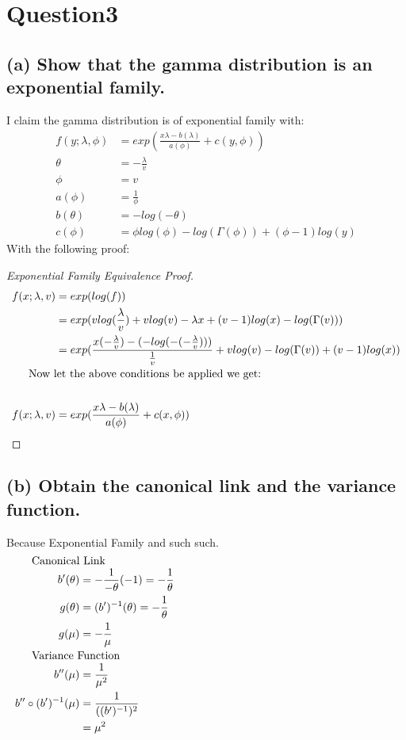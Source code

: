 \documentclass[15pt,a4paper]{article}\usepackage[]{graphicx}\usepackage[]{color}
\begin{document}
\section{Question3}
\subsection{(a) Show that the gamma distribution is an exponential family.}
I claim the gamma distribution is of exponential family with:
\begin{align*}
f(y; \lambda, \phi) &= exp(\frac{x\lambda - b(\lambda)}{a(\phi)} + c(y, \phi))\\
\theta &= -\frac{\lambda}{v}\\
\phi &= v\\
a(\phi) &= \frac{1}{\phi}\\
b(\theta) &= -log(-\theta)\\
c(\phi) &= \phi log(\phi) - log(\Gamma(\phi)) + (\phi-1)log(y)
\end{align*}
With the following proof:
\begin{proof}[Exponential Family Equivalence Proof]
    \begin{align*}
    f(x;\lambda, v) &= exp(log(f)) \\
      &= exp(vlog(\frac{\lambda}{v}) + vlog(v) -\lambda x + (v-1)log(x) - log(\Gamma(v)))\\
      &= exp(\frac{x(-\frac{\lambda}{v}) - (-log(-(-\frac{\lambda}{v})))}{\frac{1}{v}} + v log(v) - log(\Gamma(v)) + (v-1)log(x))\\
      \noalign{\text{Now let the above conditions be applied we get:}}\\
      f(x;\lambda, v) &= exp(\frac{x\lambda - b(\lambda)}{a(\phi)} + c(x, \phi))
    \end{align*}
\end{proof}

\subsection{(b) Obtain the canonical link and the variance function.}
Because Exponential Family and such such.
\begin{align*}
    \noalign{\text{Canonical Link}}
    b'(\theta) &= - \frac{1}{-\theta}(-1) = -\frac{1}{\theta}\\
    g(\theta) &= (b')^{-1}(\theta) = -\frac{1}{\theta}\\
    g(\mu) &= -\frac{1}{\mu}\\
    \noalign{\text{Variance Function}}
    b''(\mu) &= \frac{1}{\mu^2}\\
    b''\circ (b')^{-1}(\mu) &= \frac{1}{((b')^{-1})^2}\\
                               &= \mu^2
\end{align*}
\end{document}
